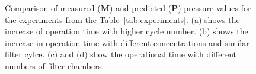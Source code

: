 \begin{figure}[h!]
{
}

\caption{Comparison of measured (\textbf{M}) and predicted (\textbf{P}) pressure values for the experiments from the Table~\ref{tab:experiments}. (a) shows the increase of operation time with higher cycle number. (b) shows the increase in operation time with different concentrations and similar filter cylce. (c) and (d) show the operational time with different numbers of filter chambers.}
\label{fig:pressure_comparison}
\end{figure}
